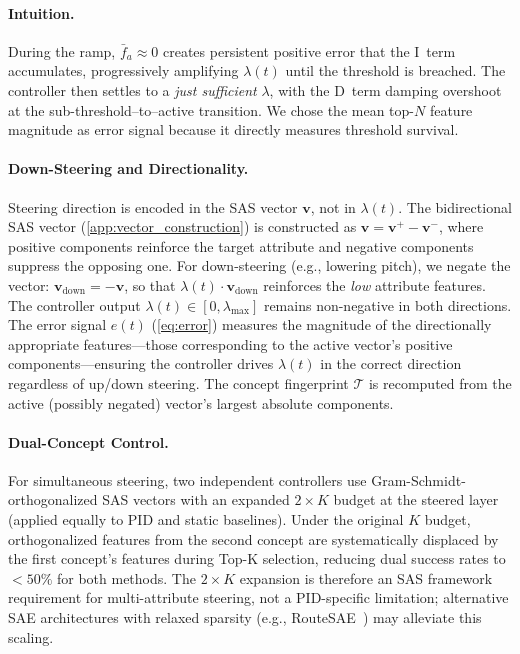 \documentclass{article}
\theoremstyle{plain}
\begin{document}
\paragraph{Intuition.}
During the ramp, $\bar{f}_a \approx 0$ creates persistent positive error that the I~term accumulates, progressively amplifying $\lambda(t)$ until the threshold is breached. The controller then settles to a \emph{just sufficient} $\lambda$, with the D~term damping overshoot at the sub-threshold--to--active transition. We chose the mean top-$N$ feature magnitude as error signal because it directly measures threshold survival.

\paragraph{Down-Steering and Directionality.}
Steering direction is encoded in the SAS vector $\mathbf{v}$, not in $\lambda(t)$. The bidirectional SAS vector (\cref{app:vector_construction}) is constructed as $\mathbf{v} = \mathbf{v}^{+} - \mathbf{v}^{-}$, where positive components reinforce the target attribute and negative components suppress the opposing one. For down-steering (e.g., lowering pitch), we negate the vector: $\mathbf{v}_\text{down} = -\mathbf{v}$, so that $\lambda(t) \cdot \mathbf{v}_\text{down}$ reinforces the \emph{low} attribute features. The controller output $\lambda(t) \in [0, \lambda_\text{max}]$ remains non-negative in both directions. The error signal $e(t)$ (\cref{eq:error}) measures the magnitude of the directionally appropriate features---those corresponding to the active vector's positive components---ensuring the controller drives $\lambda(t)$ in the correct direction regardless of up/down steering. The concept fingerprint $\mathcal{T}$ is recomputed from the active (possibly negated) vector's largest absolute components.

\paragraph{Dual-Concept Control.}
For simultaneous steering, two independent controllers use Gram-Schmidt-orthogonalized SAS vectors with an expanded $2{\times}K$ budget at the steered layer (applied equally to PID and static baselines). Under the original $K$ budget, orthogonalized features from the second concept are systematically displaced by the first concept's features during Top-K selection, reducing dual success rates to $<\!50\%$ for both methods. The $2{\times}K$ expansion is therefore an SAS framework requirement for multi-attribute steering, not a PID-specific limitation; alternative SAE architectures with relaxed sparsity (e.g., RouteSAE~\cite{shi2025routesae}) may alleviate this scaling.
\end{document}
